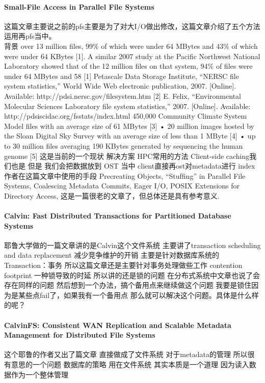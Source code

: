\documentclass[8pt,UTF8]{article}
\begin{document}
            \paragraph{Small-File Access in Parallel File Systems}
                这篇文章主要说之前的pfs主要是为了对大I/O做出修改，这篇文章介绍了五个方法运用再pfs当中。\\
                背景 over 13 million ﬁles, 99\% of which were under 64 MBytes and 43\% of which were under 64 KBytes [1]. A similar 2007 study at the Paciﬁc Northwest National Laboratory showed that of the 12 million ﬁles on that system, 94\% of ﬁles were under 64 MBytes and 58%
                [1] Petascale Data Storage Institute, “NERSC ﬁle system statistics,” World Wide Web electronic publication, 2007. [Online]. Available: http://pdsi.nersc.gov/ﬁlesystem.htm
                [2] E. Felix, “Environmental Molecular Sciences Laboratory ﬁle system statistics,” 2007. [Online]. Available: http://pdsiscidac.org/fsstats/index.html
                450,000 Community Climate System Model ﬁles with an average size of 61 MBytes [3] • 20 million images hosted by the Sloan Digital Sky Survey with an average size of less than 1 MByte [4] • up to 30 million ﬁles averaging 190 KBytes generated by sequencing the human genome [5] 这是当前的一个现状
                解决方案 HPC常用的方法 Client-side caching我们也是 但是 我们会把数据放到 OST 当中 client直接再ost对metadata进行 index 作者在这篇文章中使用的手段 Precreating Objects, “Stufﬁng” in Parallel File Systems, Coalescing Metadata Commits, Eager I/O, POSIX Extensions for Directory Access, 这是一篇很老的文章了，但总体还是具有参考意义.
            \paragraph{Calvin: Fast Distributed Transactions for Partitioned Database Systems}
                耶鲁大学做的一篇文章讲的是Calvin这个文件系统 主要讲了transaction scheduling and data replacement 减少竞争维护的开销 主要是针对数据库系统的 Transaction：事务 所以这篇文章还是主要针对事务处理做些工作
                contention footprint 一种锁导致的时延 所以讲的还是锁的问题 在分布式系统中文章也说了会存在同样的问题 然后想到一个办法，搞个备用点来继续做这个问题 我要是锁住因为是某些点fail了，如果我有一个备用点 那么就可以解决这个问题。具体是什么样的呢？
            \paragraph{CalvinFS: Consistent WAN Replication and Scalable Metadata Management for Distributed File Systems}
                这个耶鲁的作者又出了篇文章 直接做成了文件系统 对于metadata的管理
                所以很有意思的一个问题 数据库的策略 用在文件系统 其实本质是一个道理 因为读入数据作为一个整体管理
\end{document}
